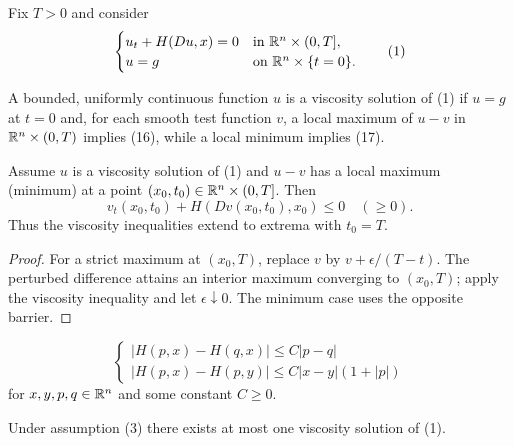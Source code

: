 Fix $T>0$ and consider
\[
\begin{cases}
u_t+H(Du,x)=0 & \text{in }\mathbb{R}^n\times(0,T],\\
u=g & \text{on }\mathbb{R}^n\times\{t=0\}.
\end{cases}
\tag{1}
\]

\begin{definition}
\label{def:viscosity-solution-finite-horizon}

A bounded, uniformly continuous function $u$ is a viscosity solution of (1) if $u=g$ at $t=0$ and, for each smooth test function $v$, a local maximum of $u-v$ in $\mathbb{R}^n\times(0,T)$ implies (16), while a local minimum implies (17).
\end{definition}

\begin{lemma}
\label{lem:extrema-at-terminal-time}

Assume $u$ is a viscosity solution of (1) and $u - v$ has a local maximum (minimum) at a point $(x_0, t_0) \in \mathbb{R}^n \times (0, T]$. Then
\[
v_t(x_0, t_0) + H(Dv(x_0, t_0), x_0) \le 0 \quad (\ge 0).
\tag{2}
\]
Thus the viscosity inequalities extend to extrema with $t_0=T$.
\end{lemma}

\begin{proof}
\sketch For a strict maximum at $(x_0,T)$, replace $v$ by $v+\epsilon/(T-t)$. The perturbed difference attains an interior maximum converging to $(x_0,T)$; apply the viscosity inequality and let $\epsilon\downarrow0$. The minimum case uses the opposite barrier.
\end{proof}

\begin{definition}
\label{def:hamiltonian-lipschitz-condition}
\[
\begin{cases}
|H(p,x) - H(q,x)| \leq C|p - q| \\
|H(p,x) - H(p,y)| \leq C|x - y|(1 + |p|)
\end{cases}
\tag{3}
\]
for $x, y, p, q \in \mathbb{R}^n$ and some constant $C \geq 0$.
\end{definition}

\begin{theorem}
\label{thm:uniqueness-viscosity-solution-hj}

Under assumption (3) there exists at most one viscosity solution of (1).
\end{theorem}


